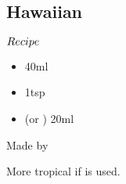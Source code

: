 \subsection{Hawaiian}
\begin{itembox}[l]{\boldmath $Recipe$}
\begin{itemize}
\setlength{\parskip}{0cm}
\setlength{\itemsep}{0cm}
\item \gin 40ml
\item \oc 1tsp
\item \oj (or \pj) 20ml
\end{itemize}
\vspace{-4mm}
Made by \shake
\end{itembox}
More tropical if \pj is used.
